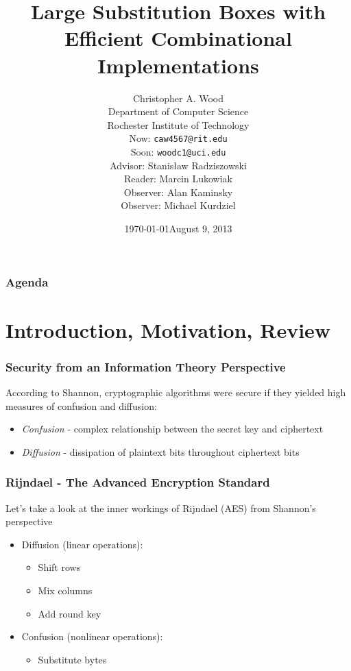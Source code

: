 \documentclass[10pt]{beamer}
\title[Large Substitution Boxes with Efficient Combinational Implementations]{Large Substitution Boxes with Efficient Combinational Implementations}
\institute[RIT]{}
\date{\today}
\author[Christopher A. Wood]{Christopher A. Wood \\ Department of Computer Science \\ Rochester Institute of Technology \\ \vspace{1em} {\scriptsize Now: {\tt caw4567@rit.edu} \\ Soon: {\tt woodc1@uci.edu}} \\ \vspace{2em}
{\scriptsize Advisor: Stanis{\l}aw Radziszowski \\ Reader: Marcin Lukowiak \\ Observer: Alan Kaminsky \\ Observer: Michael Kurdziel}
}
\date{August 9, 2013}
\begin{document}
\begin{frame}
	\titlepage
\end{frame}

\begin{frame}
	\frametitle{Agenda}
	\tableofcontents
\end{frame}


\section{Introduction, Motivation, Review}
\begin{frame}
	\frametitle{Security from an Information Theory Perspective}
	According to Shannon, cryptographic algorithms were secure if they yielded high measures of confusion and diffusion:
	\begin{itemize}
		\item \emph{Confusion} - complex relationship between the secret key and ciphertext
		\item \emph{Diffusion} - dissipation of plaintext bits throughout ciphertext bits
	\end{itemize}
\end{frame}

\begin{frame}
	\frametitle{Rijndael - The Advanced Encryption Standard}
	Let's take a look at the inner workings of Rijndael (AES) from Shannon's perspective
	\begin{itemize}
		\item Diffusion (linear operations):
		\begin{itemize}
			\item Shift rows
			\item Mix columns
			\item Add round key
		\end{itemize}
		\item Confusion (nonlinear operations):
		\begin{itemize}
			\item Substitute bytes
		\end{itemize}
	\end{itemize}
\end{frame}
\end{document}
